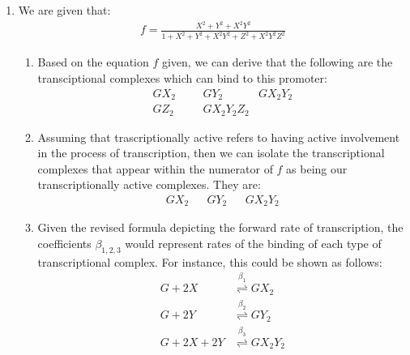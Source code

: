 \documentclass[10pt]{article}
\begin{document}
\begin{enumerate}
\item We are given that: \begin{align*}  f = \frac{X^2 + Y^2 + X^2Y^2}{1+X^2 + Y^2 + X^2Y^2 + Z^2 + X^2Y^2Z^2} \end{align*}
\begin{enumerate}
\item Based on the equation $f$ given, we can derive that the following are the transciptional complexes which can bind to this promoter: \begin{align*} GX_2 & & &GY_2 & GX_2Y_2 \\ GZ_2  &&& GX_2Y_2Z_2 \end{align*}
\item Assuming that trascriptionally active refers to having active involvement in the process of transcription, then we can isolate the transcriptional complexes that appear within the numerator of $f$ as being our transcriptionally active complexes. They are: \begin{align*} GX_2 && GY_2 && GX_2Y_2 \end{align*}
\item Given the revised formula depicting the forward rate of transcription, the coefficients $\beta_{1,2,3}$ would represent rates of the binding of each type of transcriptional complex. For instance, this could be shown as follows: \begin{align*} G + 2X &\overset{\beta_1}{\rightleftharpoons} GX_2 \\ G + 2Y &\overset{\beta_2}{\rightleftharpoons} GY_2 \\ G + 2X + 2Y &\overset{\beta_3}{\rightleftharpoons} GX_2Y_2 \end{align*}
\end{enumerate}
\end{enumerate}
\end{document}

